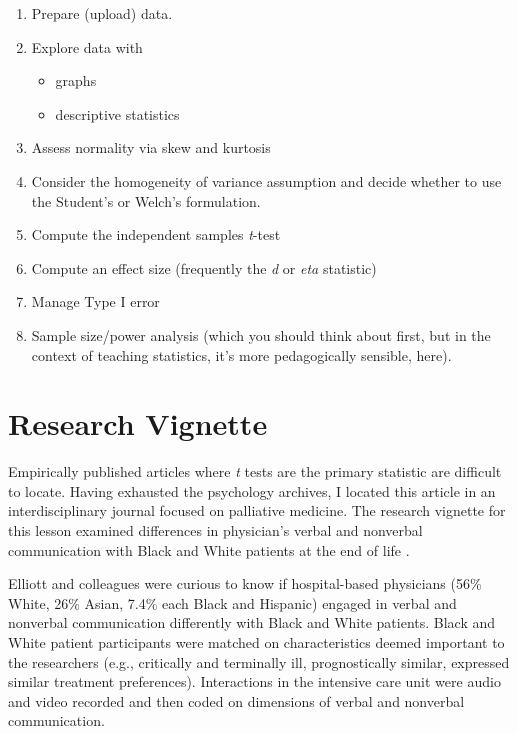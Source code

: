 \documentclass[
  11pt,
]{book}
\providecommand{\tightlist}{%
  \setlength{\itemsep}{0pt}\setlength{\parskip}{0pt}}
\begin{document}
\begin{enumerate}
\def\labelenumi{\arabic{enumi}.}
\tightlist
\item
  Prepare (upload) data.
\item
  Explore data with

  \begin{itemize}
  \tightlist
  \item
    graphs
  \item
    descriptive statistics
  \end{itemize}
\item
  Assess normality via skew and kurtosis
\item
  Consider the homogeneity of variance assumption and decide whether to use the Student's or Welch's formulation.
\item
  Compute the independent samples \emph{t}-test
\item
  Compute an effect size (frequently the \emph{d} or \emph{eta} statistic)
\item
  Manage Type I error
\item
  Sample size/power analysis (which you should think about first, but in the context of teaching statistics, it's more pedagogically sensible, here).
\end{enumerate}

\hypertarget{research-vignette-2}{%
\section{Research Vignette}\label{research-vignette-2}}

Empirically published articles where \emph{t} tests are the primary statistic are difficult to locate. Having exhausted the psychology archives, I located this article in an interdisciplinary journal focused on palliative medicine. The research vignette for this lesson examined differences in physician's verbal and nonverbal communication with Black and White patients at the end of life \citep{elliott_differences_2016}.

Elliott and colleagues \citeyearpar{elliott_differences_2016} were curious to know if hospital-based physicians (56\% White, 26\% Asian, 7.4\% each Black and Hispanic) engaged in verbal and nonverbal communication differently with Black and White patients. Black and White patient participants were matched on characteristics deemed important to the researchers (e.g., critically and terminally ill, prognostically similar, expressed similar treatment preferences). Interactions in the intensive care unit were audio and video recorded and then coded on dimensions of verbal and nonverbal communication.
\end{document}
